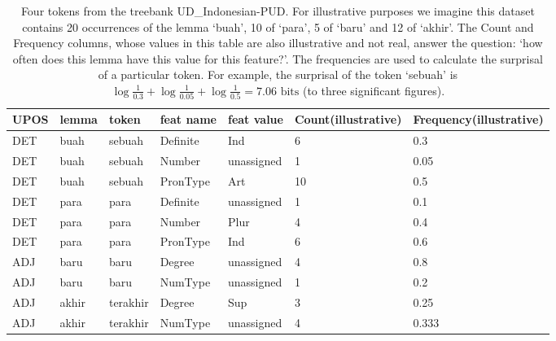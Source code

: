 \documentclass[USenglish]{article}
\begin{document}
\begin{table}[h]
    \centering
    \caption{Four tokens from the treebank UD\_Indonesian-PUD. For illustrative purposes we imagine this dataset contains 20 occurrences of the lemma `buah', 10 of `para', 5 of `baru' and 12 of `akhir'. The Count and Frequency columns, whose values in this table are also illustrative and not real, answer the question: `how often does this lemma have this value for this feature?'. The frequencies are used to calculate the surprisal of a particular token. For example, the surprisal of the token `sebuah' is $\log{\frac{1}{0.3}}+\log{\frac{1}{0.05}}+\log{\frac{1}{0.5}} = 7.06\text{ bits}$ (to three significant figures).} %
    \label{tab:unassigned_ex_SPLIT}   
    \begin{tabular}{p{0.7cm}p{1cm}p{1.4cm}p{1.3cm}p{1.5cm}p{1.4cm}p{1.6cm}}
\toprule

UPOS&lemma	&token	&feat name & feat value & Count\newline (illustrative) & Frequency\newline (illustrative)	\\ \midrule

DET & buah & sebuah & Definite& Ind & 6 & 0.3\\
DET & buah & sebuah & Number& unassigned & 1 & 0.05\\
DET & buah & sebuah & PronType& Art & 10 & 0.5
\\\midrule
DET & para	& para	&Definite & unassigned & 1 & 0.1\\
DET & para	& para	&Number & Plur & 4 & 0.4\\
DET & para	& para	&PronType & Ind & 6 & 0.6
\\\midrule
ADJ&baru	&baru& Degree&unassigned & 4 & 0.8\\
ADJ&baru	&baru& NumType&unassigned & 1 & 0.2 \\\midrule
ADJ & akhir	&terakhir&	Degree& Sup & 3 & 0.25\\
ADJ & akhir	&terakhir&	NumType & unassigned & 4 & 0.333\\
\bottomrule
\end{tabular}
\end{table}
\end{document}
